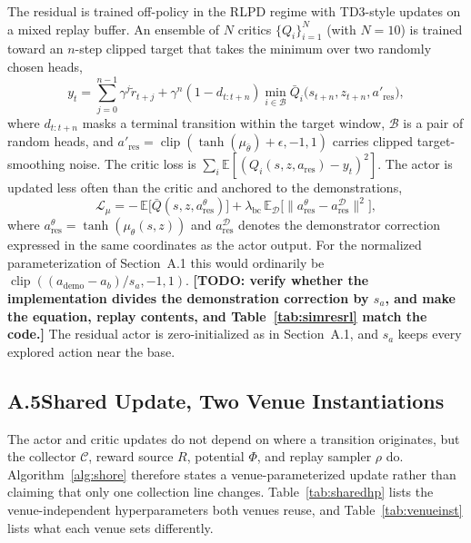 \documentclass[letterpaper]{article} %
\newcommand{\todo}[1]{\textbf{[TODO: #1]}}
\begin{document}
The residual is trained off-policy in the RLPD regime with TD3-style updates on a
mixed replay buffer. An ensemble of $N$ critics $\{Q_i\}_{i=1}^{N}$ (with $N=10$) is
trained toward an $n$-step clipped target that takes the minimum over two randomly chosen
heads,
\[
y_t=\sum_{j=0}^{n-1}\gamma^j\tilde r_{t+j}
+\gamma^n(1-d_{t:t+n})
\min_{i\in\mathcal{B}}\bar Q_i\big(s_{t+n},z_{t+n},a'_{\mathrm{res}}\big),
\]
where $d_{t:t+n}$ masks a terminal transition within the target window,
$\mathcal{B}$ is a pair of random heads, and
$a'_{\mathrm{res}}=\operatorname{clip}(\tanh(\mu_{\bar\theta})+\epsilon,-1,1)$ carries
clipped target-smoothing noise. The critic loss is
$\sum_i\mathbb{E}[(Q_i(s,z,a_{\mathrm{res}})-y_t)^2]$. The actor is updated less often
than the critic and anchored to the demonstrations,
\[
\mathcal{L}_{\mu}=-\,\mathbb{E}\big[\bar Q(s,z,a_{\mathrm{res}}^\theta)\big]
+\lambda_{\mathrm{bc}}\,\mathbb{E}_{\mathcal{D}}
\big[\lVert a_{\mathrm{res}}^\theta-a_{\mathrm{res}}^{\mathcal D}\rVert^2\big],
\]
where $a_{\mathrm{res}}^\theta=\tanh(\mu_\theta(s,z))$ and
$a_{\mathrm{res}}^{\mathcal D}$ denotes the demonstrator correction expressed in the
same coordinates as the actor output. For the normalized parameterization of
Section~A.1 this would ordinarily be
$\operatorname{clip}((a_{\mathrm{demo}}-a_b)/s_a,-1,1)$.
\todo{verify whether the implementation divides the demonstration correction by $s_a$,
and make the equation, replay contents, and Table~\ref{tab:simresrl} match the code.}
The residual actor is zero-initialized as in Section~A.1, and $s_a$ keeps every explored
action near the base.

\subsection{A.5\quad Shared Update, Two Venue Instantiations}

The actor and critic updates do not depend on where a transition originates, but the
collector $\mathcal C$, reward source $R$, potential $\Phi$, and replay sampler $\rho$ do.
Algorithm~\ref{alg:shore} therefore states a venue-parameterized update rather than
claiming that only one collection line changes. Table~\ref{tab:sharedhp} lists the
venue-independent hyperparameters both venues reuse, and Table~\ref{tab:venueinst} lists
what each venue sets differently.
\end{document}
